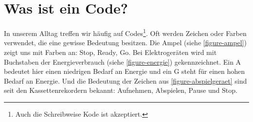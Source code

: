
\toggletrue{image}
\toggletrue{imagehover}

\chapter{Was ist ein Code?}
\label{chapter-was-ist-ein-code}

In unserem Alltag treffen wir häufig auf Codes\footnote{Auch die Schreibweise Kode ist akzeptiert.}. Oft werden Zeichen oder Farben verwendet, die eine gewisse Bedeutung besitzen. Die Ampel (siehe \autoref{figure-ampel}) zeigt uns mit Farben an: Stop, Ready, Go. Bei Elektrogeräten wird mit Buchstaben der Energieverbrauch (siehe \autoref{figure-energie}) gekennzeichnet. Ein A bedeutet hier einen niedrigen Bedarf an Energie und ein G steht für einen hohen Bedarf an Energie. Und die Bedeutung der Zeichen aus \autoref{figure-abspielgeraet} sind seit den Kassettenrekordern bekannt: Aufnehmen, Abspielen, Pause und Stop.

